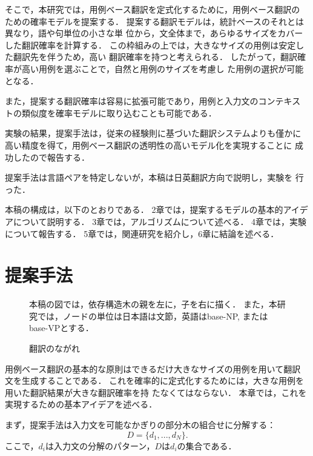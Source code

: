 そこで，本研究では，用例ベース翻訳を定式化するために，用例ベース翻訳の
ための確率モデルを提案する．
提案する翻訳モデルは，統計ベースのそれとは異なり，語や句単位の小さな単
位から，文全体まで，あらゆるサイズをカバーした翻訳確率を計算する．
この枠組みの上では，大きなサイズの用例は安定した翻訳先を伴うため，高い
翻訳確率を持つと考えられる．
したがって，翻訳確率が高い用例を選ぶことで，自然と用例のサイズを考慮し
た用例の選択が可能となる．

また，提案する翻訳確率は容易に拡張可能であり，用例と入力文のコンテキス
トの類似度を確率モデルに取り込むことも可能である．

実験の結果，提案手法は，従来の経験則に基づいた翻訳システムよりも僅かに
高い精度を得て，用例ベース翻訳の透明性の高いモデル化を実現することに
成功したので報告する．

提案手法は言語ペアを特定しないが，本稿は日英翻訳方向で説明し，実験を
行った．

本稿の構成は，以下のとおりである．
2章では，提案するモデルの基本的アイデアについて説明する．
3章では，アルゴリズムについて述べる．
4章では，実験について報告する．
5章では，関連研究を紹介し，6章に結論を述べる．

\section{提案手法}

	
	
	
	\begin{figure}
	\begin{center}
	\epsfxsize=120mm
	\end{center}
	\caption{翻訳のながれ}
	\label{f_prob.eps}
	{\footnotesize * 本稿の図では，依存構造木の親を左に，子を右に描く．
	また，本研究では，ノードの単位は日本語は文節，英語はbase-NP,
	またはbase-VPとする．\par}
	\end{figure}
	
	
	

用例ベース翻訳の基本的な原則はできるだけ大きなサイズの用例を用いて翻訳
文を生成することである．
これを確率的に定式化するためには，大きな用例を用いた翻訳結果が大きな翻訳確率を持
たなくてはならない．
本章では，これを実現するための基本アイデアを述べる．


まず，提案手法は入力文を可能なかぎりの部分木の組合せに分解する：
\begin{equation}
D= \{d_{1},...,d_{N}\}.
\end{equation}
ここで，$d_{i}$は入力文の分解のパターン，$D$は$d_{i}$の集合である．

